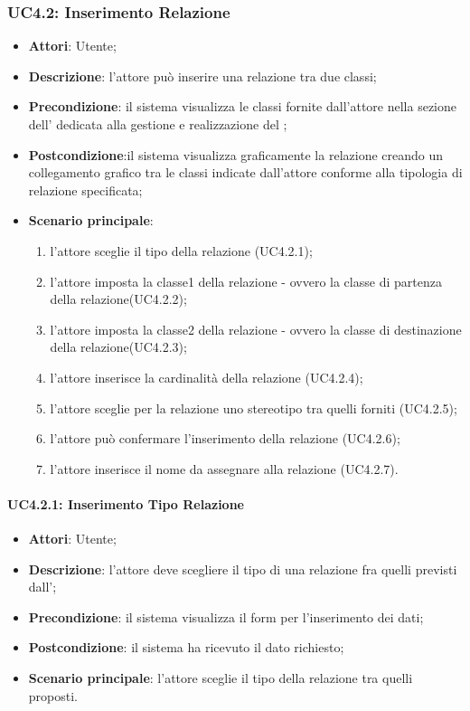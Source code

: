 \subsubsection{UC4.2: Inserimento Relazione}
\label{UC4.2}
\begin{itemize}
\item \textbf{Attori}: Utente;
\item \textbf{Descrizione}: l'attore può inserire una relazione tra due classi;
\item \textbf{Precondizione}: il sistema visualizza le classi fornite dall'attore nella sezione dell' dedicata alla gestione e realizzazione del ;
\item \textbf{Postcondizione}:il sistema visualizza graficamente la relazione creando un collegamento grafico tra le classi indicate dall'attore conforme alla tipologia di relazione specificata;
\item \textbf{Scenario principale}:
\begin{enumerate}
	\item l'attore sceglie il tipo della relazione (UC4.2.1); 
	\item l'attore imposta la classe1 della relazione - ovvero la classe di partenza della relazione(UC4.2.2);
	\item l'attore imposta la classe2 della relazione - ovvero la classe di destinazione della relazione(UC4.2.3);
	\item l'attore inserisce la cardinalità della relazione (UC4.2.4);
	\item l'attore sceglie per la relazione uno stereotipo tra quelli forniti (UC4.2.5);
	\item l'attore può confermare l'inserimento della relazione (UC4.2.6);
	\item l'attore inserisce il nome da assegnare alla relazione (UC4.2.7).
\end{enumerate}
\end{itemize}

\paragraph{UC4.2.1: Inserimento Tipo Relazione}
\label{UC4.2.1}
\begin{itemize}
\item \textbf{Attori}: Utente;
\item \textbf{Descrizione}: l'attore deve scegliere il tipo di una relazione fra quelli previsti dall';
\item \textbf{Precondizione}: il sistema visualizza il form per l'inserimento dei dati;
\item \textbf{Postcondizione}: il sistema ha ricevuto il dato richiesto;
\item \textbf{Scenario principale}:
l'attore sceglie il tipo della relazione tra quelli proposti.
\end{itemize}

